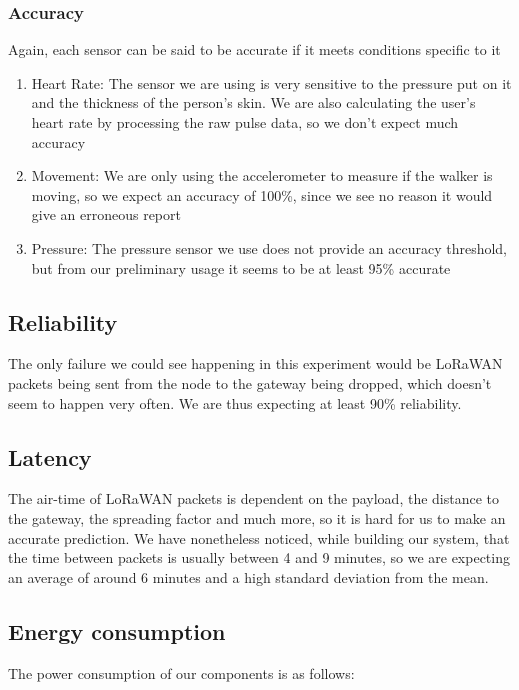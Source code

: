 		\subsubsection{Accuracy}
			Again, each sensor can be said to be accurate if it meets conditions specific to it 

			\begin{enumerate}
				\item Heart Rate: The sensor we are using is very sensitive to the pressure put on it and the thickness of the person's skin. We are also calculating the user's heart rate by processing the raw pulse data, so we don't expect much accuracy
				\item Movement: We are only using the accelerometer to measure if the walker is moving, so we expect an accuracy of 100\%, since we see no reason it would give an erroneous report
				\item Pressure: The pressure sensor we use does not provide an accuracy threshold, but from our preliminary usage it seems to be at least 95\% accurate
			\end{enumerate}

		\subsection{Reliability}
			The only failure we could see happening in this experiment would be LoRaWAN packets being sent from the node to the gateway being dropped, which doesn't seem to happen very often. We are thus expecting at least 90\% reliability. 

		\subsection{Latency}
			The air-time of LoRaWAN packets is dependent on the payload, the distance to the gateway, the spreading factor and much more, so it is hard for us to make an accurate prediction. We have nonetheless noticed, while building our system, that the time between packets is usually between 4 and 9 minutes, so we are expecting an average of around 6 minutes and a high standard deviation from the mean.
		\newline
		\newline
		\newline
		\subsection{Energy consumption}
			The power consumption of our components is as follows:


